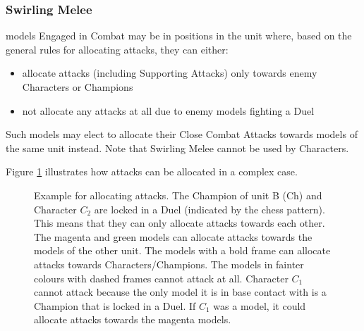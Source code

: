 \subsubsection{Swirling Melee}
\label{swirling_melee}

\rnf{} models Engaged in Combat may be in positions in the unit where, based on the general rules for allocating attacks, they can either:
\begin{itemize}
\item allocate attacks (including Supporting Attacks) only towards enemy Characters or Champions
\item not allocate any attacks at all due to enemy models fighting a Duel
\end{itemize}
Such models may elect to allocate their Close Combat Attacks towards \rnf{} models of the same unit instead. Note that Swirling Melee cannot be used by Characters.

Figure \ref{figure/allocate_attacks} illustrates how attacks can be allocated in a complex case.

\newcommand{\figAHCharOne}{$C_{1} $}
\newcommand{\figAHCharTwo}{$C_{2} $}
\newcommand{\figAHCharThree}{$C_{3} $}
\newcommand{\figAHChamp}{Ch}

\begin{figure}[!htbp]
\begin{minipage}{0.48\textwidth}
\def\svgwidth{\textwidth}

\end{minipage}\hfill\begin{minipage}{0.51\textwidth}
\caption{Example for allocating attacks.\vspace*{10pt}\newline
The Champion of unit B (Ch) and Character $C_{2} $ are locked in a Duel (indicated by the chess pattern). This means that they can only allocate attacks towards each other. The magenta and green models can allocate attacks towards the \rnf{} models of the other unit. The models with a bold frame can allocate attacks towards Characters/Champions. The models in fainter colours with dashed frames cannot attack at all. Character $C_{1} $ cannot attack because the only model it is in base contact with is a Champion that is locked in a Duel. If $C_{1} $ was a \rnf{} model, it could allocate attacks towards the magenta \rnf{} models.}
\label{figure/allocate_attacks}
\end{minipage}
\end{figure}

